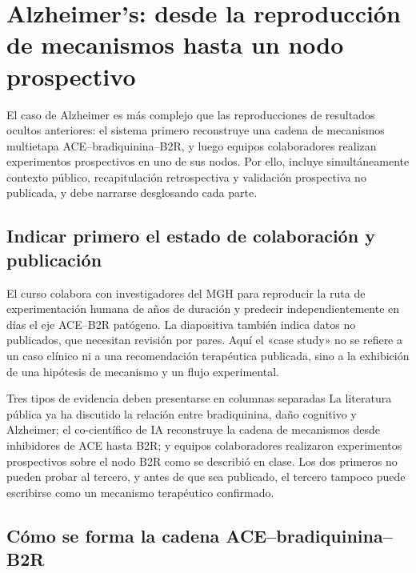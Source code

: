 \section{Alzheimer's: desde la reproducción de mecanismos hasta un nodo prospectivo}

El caso de Alzheimer es más complejo que las reproducciones de resultados ocultos anteriores: el sistema primero reconstruye una cadena de mecanismos multietapa ACE--bradiquinina--B2R, y luego equipos colaboradores realizan experimentos prospectivos en uno de sus nodos. Por ello, incluye simultáneamente contexto público, recapitulación retrospectiva y validación prospectiva no publicada, y debe narrarse desglosando cada parte.

\subsection{Indicar primero el estado de colaboración y publicación}

El curso colabora con investigadores del MGH para reproducir la ruta de experimentación humana de años de duración y predecir independientemente en días el eje ACE--B2R patógeno. La diapositiva también indica datos no publicados, que necesitan revisión por pares. Aquí el «case study» no se refiere a un caso clínico ni a una recomendación terapéutica publicada, sino a la exhibición de una hipótesis de mecanismo y un flujo experimental.


\begin{warningbox}{Tres tipos de evidencia deben presentarse en columnas separadas}
La literatura pública ya ha discutido la relación entre bradiquinina, daño cognitivo y Alzheimer; el co-científico de IA reconstruye la cadena de mecanismos desde inhibidores de ACE hasta B2R; y equipos colaboradores realizaron experimentos prospectivos sobre el nodo B2R como se describió en clase. Los dos primeros no pueden probar al tercero, y antes de que sea publicado, el tercero tampoco puede escribirse como un mecanismo terapéutico confirmado.
\end{warningbox}

\subsection{Cómo se forma la cadena ACE--bradiquinina--B2R}

